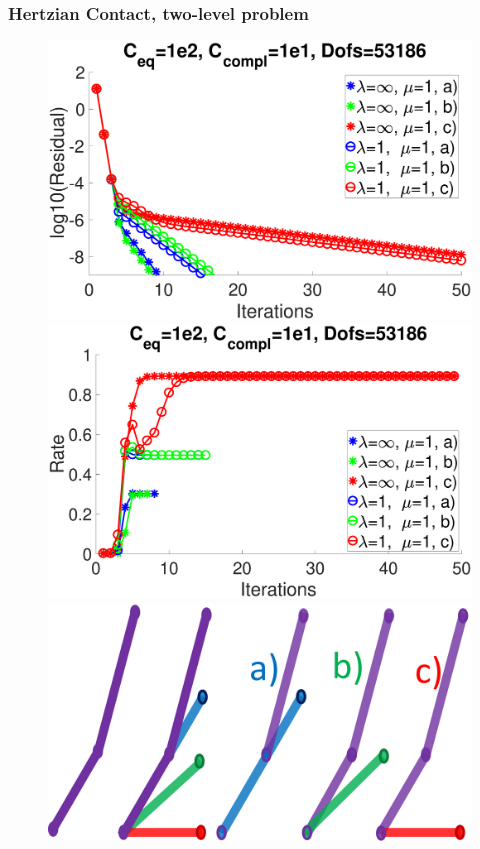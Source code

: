 \documentclass[8pt, oneside]{beamer}   	%
\newcommand{\titlecolor}[1]{\frametitle{\textcolor{dkgrey}{ \textbf{#1}}}}
\begin{document}
\begin{frame}
\titlecolor{Hertzian Contact, two-level problem}
\begin{figure}[htbp!]
	\includegraphics[scale=0.08]{img/ResidualsNonUniform.eps}
		\includegraphics[scale=0.08]{img/RatesNonUniform.eps}\\
		\includegraphics[scale=0.071]{img/coarseconstraintabc.pdf}

\end{figure}
\end{frame}
\end{document}
